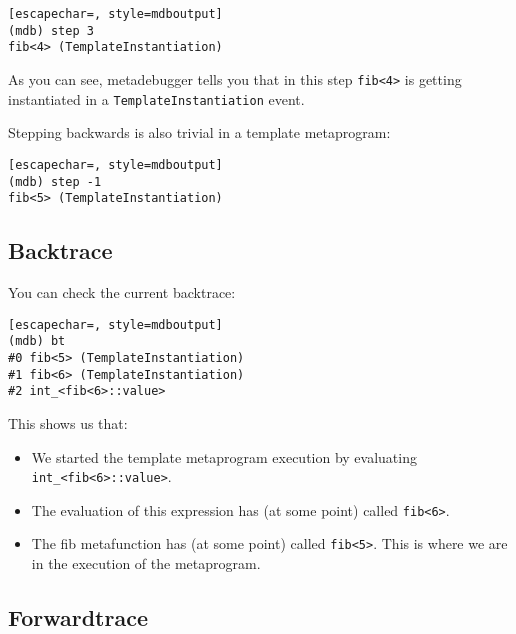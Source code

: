 \begin{minipage}{\linewidth}
\begin{lstlisting}[escapechar=, style=mdboutput]
(mdb) step 3
fib<4> (TemplateInstantiation)
\end{lstlisting}
\end{minipage}

As you can see, metadebugger tells you that in this step \texttt{fib<4>} is
getting instantiated in a \texttt{TemplateInstantiation} event.

Stepping backwards is also trivial in a template metaprogram:

\begin{minipage}{\linewidth}
\begin{lstlisting}[escapechar=, style=mdboutput]
(mdb) step -1
fib<5> (TemplateInstantiation)
\end{lstlisting}
\end{minipage}

\subsection{Backtrace}

You can check the current backtrace:

\begin{minipage}{\linewidth}
\begin{lstlisting}[escapechar=, style=mdboutput]
(mdb) bt
#0 fib<5> (TemplateInstantiation)
#1 fib<6> (TemplateInstantiation)
#2 int_<fib<6>::value>
\end{lstlisting}
\end{minipage}

This shows us that:

\begin{itemize}
    \item
        We started the template metaprogram execution by evaluating
        \texttt{int\_<fib<6>::value>}.
    \item
        The evaluation of this expression has (at some point) called
        \texttt{fib<6>}.
    \item
        The fib metafunction has (at some point) called \texttt{fib<5>}.
        This is where we are in the execution of the metaprogram.
\end{itemize}

\subsection{Forwardtrace}

